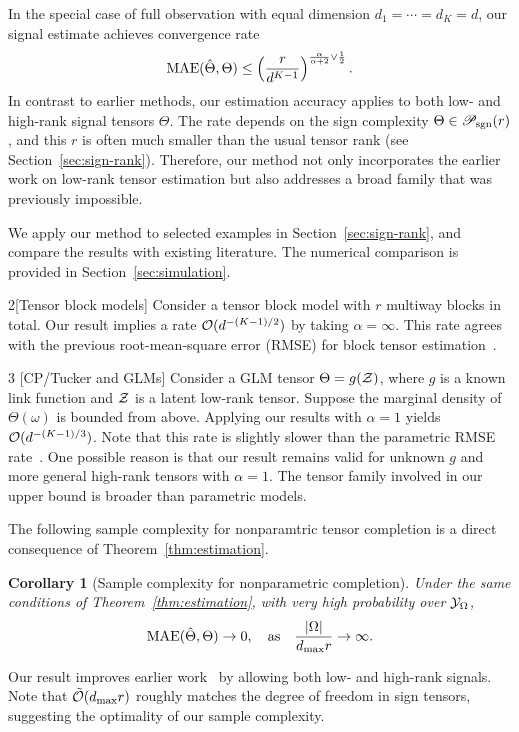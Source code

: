 \documentclass{article}
\theoremstyle{plain}
\newtheorem{cor}{Corollary}
\theoremstyle{definition}
\def\caliP{\mathscr{P}_{\textup{sgn}}}
\begin{document}
In the special case of full observation with equal dimension $d_1=\cdots=d_K=d$, our signal estimate achieves convergence rate
\begin{equation}
\textup{MAE}(\hat \Theta, \Theta)\leq \left(r\over d^{K-1}\right)^{{\alpha \over \alpha+2} \vee {1\over 2}}.
\end{equation}
In contrast to earlier methods, our estimation accuracy applies to both low- and high-rank signal tensors $\Theta$. The rate depends on the sign complexity $\Theta\in\caliP(r)$, and this $r$ is often much smaller than the usual tensor rank (see Section~\ref{sec:sign-rank}). Therefore, our method not only incorporates the earlier work on low-rank tensor estimation but also addresses a broad family that was previously impossible. 

We apply our method to selected examples in Section~\ref{sec:sign-rank}, and compare the results with existing literature. The numerical comparison is provided in Section~\ref{sec:simulation}. 
\begin{customexample}{2}[Tensor block models]
Consider a tensor block model with $r$ multiway blocks in total. Our result implies a rate $\mathcal{O}(d^{-(K-1)/2})$ by taking $\alpha=\infty$. This rate agrees with the  previous root-mean-square error (RMSE) for block tensor estimation~\cite{wang2019multiway}.
\end{customexample}

\begin{customexample}{3} [CP/Tucker and GLMs] 
Consider a GLM tensor $\Theta=g(\mathcal{Z})$, where $g$ is a known link function and $\mathcal{Z}$ is a latent low-rank tensor. Suppose the marginal density of $\Theta(\omega)$ is bounded from above. Applying our results with $\alpha=1$ yields $\mathcal{O}(d^{-(K-1)/3})$. Note that this rate is slightly slower than the parametric RMSE rate~\cite{zhang2018tensor,wang2018learning}. One possible reason is that our result remains valid for unknown $g$ and more general high-rank tensors with $\alpha=1$. The tensor family involved in our upper bound is broader than parametric models. 
\end{customexample}

The following sample complexity for nonparamtric tensor completion is a direct consequence of Theorem~\ref{thm:estimation}. 
\begin{cor}[Sample complexity for nonparametric completion] Under the same conditions of Theorem~\ref{thm:estimation}, with very high probability over $\mathcal{Y}_\Omega$, 
\[
\textup{MAE}(\hat \Theta, \Theta)\to 0, \quad \text{as}\quad {|\Omega|\over {d_{\max}} r}\to \infty.
\]
\end{cor}
Our result improves earlier work~\cite{ghadermarzy2019near} by allowing both low- and high-rank signals. Note that $\tilde {\mathcal{O}}(d_{\max}r)$ roughly matches the degree of freedom in sign tensors, suggesting the optimality of our sample complexity. 
\end{document}
